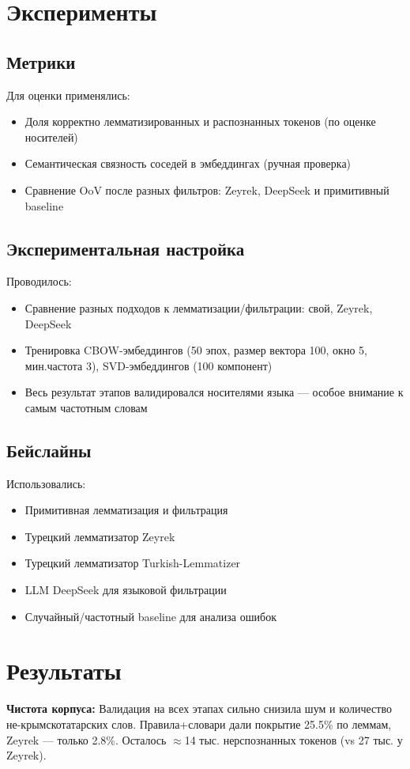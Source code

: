 \documentclass{article}
\begin{document}
\section{Эксперименты}
\subsection{Метрики}
Для оценки применялись:
\begin{itemize}
    \item Доля корректно лемматизированных и распознанных токенов (по оценке носителей)
    \item Семантическая связность соседей в эмбеддингах (ручная проверка)
    \item Сравнение OoV после разных фильтров: Zeyrek, DeepSeek и примитивный baseline
\end{itemize}

\subsection{Экспериментальная настройка}
Проводилось:
\begin{itemize}
    \item Сравнение разных подходов к лемматизации/фильтрации: свой, Zeyrek, DeepSeek
    \item Тренировка CBOW-эмбеддингов (50 эпох, размер вектора 100, окно 5, мин.частота 3), SVD-эмбеддингов (100 компонент)
    \item Весь результат этапов валидировался носителями языка — особое внимание к самым частотным словам
\end{itemize}

\subsection{Бейслайны}
Использовались:
\begin{itemize}
    \item Примитивная лемматизация и фильтрация
    \item Турецкий лемматизатор Zeyrek~\cite{zeyreklem}
    \item Турецкий лемматизатор Turkish-Lemmatizer~\cite{turkishlemmatizer}
    \item LLM DeepSeek для языковой фильтрации
    \item Случайный/частотный baseline для анализа ошибок
\end{itemize}

\section{Результаты}
\textbf{Чистота корпуса:} Валидация на всех этапах сильно снизила шум и количество не-крымскотатарских слов. Правила+словари дали покрытие 25.5\% по леммам, Zeyrek — только 2.8\%. Осталось $\approx$14 тыс. нерспознанных токенов (vs 27 тыс. у Zeyrek).
\end{document}
